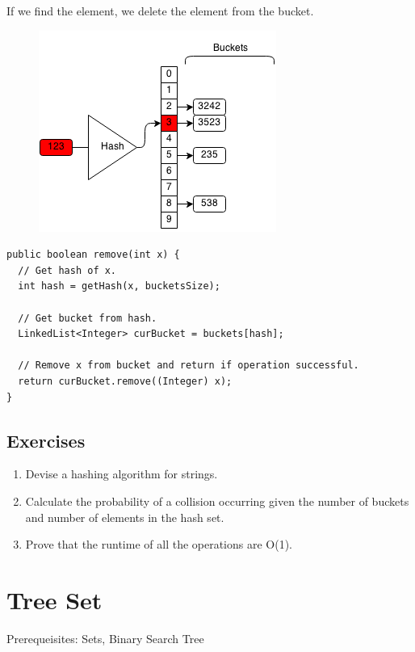 \documentclass[11pt,oneside]{book}
\makeatletter
\def\maxwidth#1{\ifdim\Gin@nat@width>#1 #1\else\Gin@nat@width\fi}
\makeatother
\begin{document}
If we find the element, we delete the element from the bucket.

\vspace{5px}\begin{figure}[H]\centering
        \includegraphics[width=0.66\maxwidth{\textwidth}]{hashsetrem3.png}
        \end{figure}

\begin{lstlisting}
public boolean remove(int x) {
  // Get hash of x.
  int hash = getHash(x, bucketsSize);
  
  // Get bucket from hash.
  LinkedList<Integer> curBucket = buckets[hash];
  
  // Remove x from bucket and return if operation successful.
  return curBucket.remove((Integer) x);
}
\end{lstlisting}

\subsection{Exercises}

\begin{enumerate}
\item Devise a hashing algorithm for strings.
\item Calculate the probability of a collision occurring given the number of buckets and number of elements in the hash set.
\item Prove that the runtime of all the operations are O(1).
\end{enumerate}

        \section{ Tree Set }
        

Prerequeisites: Sets, Binary Search Tree
\end{document}
